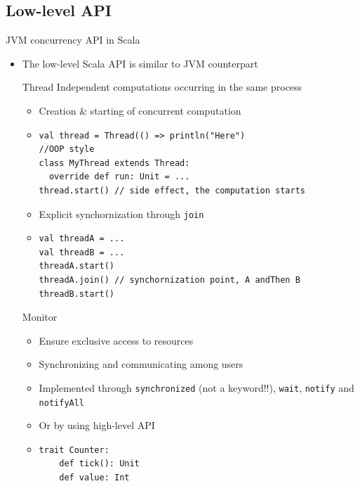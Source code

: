 \documentclass[presentation, 9pt]{beamer}\mode<presentation>{\usetheme{AMSBolognaFC}}
\begin{document}
\subsection{Low-level API}
\begin{frame}{JVM concurrency API in Scala}
	\begin{itemize}
		\item The low-level Scala API is similar to JVM counterpart
  	\begin{alertblock}{Thread}
			Independent computations occurring in the same process 
			\begin{itemize}
				\item Creation \& starting of concurrent computation
    		\item[] \begin{tcolorbox}[left=0pt, top=0pt, bottom=0pt]
					\begin{verbatim}
val thread = Thread(() => println("Here")
//OOP style
class MyThread extends Thread:
  override def run: Unit = ...
thread.start() // side effect, the computation starts
					\end{verbatim}
				\end{tcolorbox}

				\item Explicit synchornization through \texttt{join}
				\item[] \begin{tcolorbox}[left=0pt, top=0pt, bottom=0pt]
					\begin{verbatim}
val threadA = ...
val threadB = ...
threadA.start()
threadA.join() // synchornization point, A andThen B
threadB.start()
					\end{verbatim}
				\end{tcolorbox}
			\end{itemize}
		\end{alertblock}
		\begin{alertblock}{Monitor}
			\begin{itemize}
				\item Ensure exclusive access to resources 
				\item Synchronizing and communicating among users
    		\item Implemented through \texttt{synchronized} (not a keyword!!), \texttt{wait}, \texttt{notify} and \texttt{notifyAll}
      	\item Or by using high-level API
    		\item[] \begin{tcolorbox}[left=0pt, top=0pt, bottom=0pt]
					\begin{verbatim}
trait Counter:
	def tick(): Unit
	def value: Int


\end{verbatim}
\end{tcolorbox}
\end{itemize}
\end{alertblock}
\end{itemize}
\end{frame}
\end{document}

